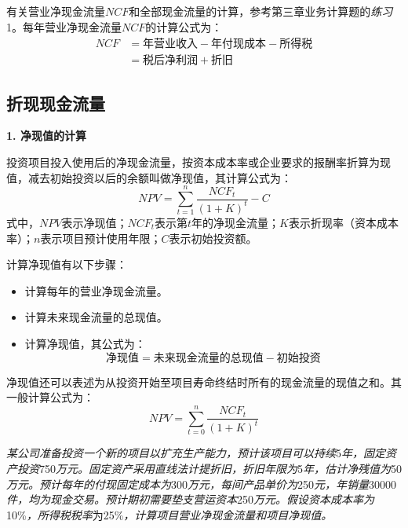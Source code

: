 \documentclass[
  10pt,
  twoside,
  openany,
  b5paper, %
  colorscheme = black, %
  xits = false,
]{qyxf-book}
\begin{document}
有关营业净现金流量$NCF$和全部现金流量的计算，参考第三章业务计算题的\emph{练习}1。每年营业净现金流量$NCF$的计算公式为：
\begin{equation*}
	\begin{aligned}
		NCF &= \text{年营业收入} - \text{年付现成本} - \text{所得税} \\
	&= \text{税后净利润} + \text{折旧}
	\end{aligned}
\end{equation*}

\subsection{折现现金流量}

\textbf{1. 净现值的计算}

投资项目投入使用后的净现金流量，按资本成本率或企业要求的报酬率折算为现值，减去初始投资以后的余额叫做净现值，其计算公式为：
\begin{equation*}
	NPV = \sum_{t=1}^{n} \frac{NCF_t}{(1+K)^t}-C
\end{equation*}
式中，$NPV$表示净现值；$NCF_t$表示第$t$年的净现金流量；$K$表示折现率（资本成本率）；$n$表示项目预计使用年限；$C$表示初始投资额。

计算净现值有以下步骤：
\begin{itemize}
	\item 计算每年的营业净现金流量。
	\item 计算未来现金流量的总现值。
	\item 计算净现值，其公式为：
	\begin{equation*}
		\text{净现值} = \text{未来现金流量的总现值}- \text{初始投资}
	\end{equation*}
\end{itemize}
净现值还可以表述为从投资开始至项目寿命终结时所有的现金流量的现值之和。其一般计算公式为：
\begin{equation*}
	NPV = \sum_{t=0}^{n} \frac{NCF_t}{(1+K)^t}
\end{equation*}

\emph{某公司准备投资一个新的项目以扩充生产能力，预计该项目可以持续}5\emph{年，固定资产投资}750\emph{万元。固定资产采用直线法计提折旧，折旧年限为}5\emph{年，估计净残值为}50\emph{万元。预计每年的付现固定成本为}300\emph{万元，每间产品单价为}250\emph{元，年销量}30000\emph{件，均为现金交易。预计期初需要垫支营运资本}250\emph{万元。假设资本成本率为}10\%\emph{，所得税税率}为25\%\emph{，计算项目营业净现金流量和项目净现值。}
\end{document}
